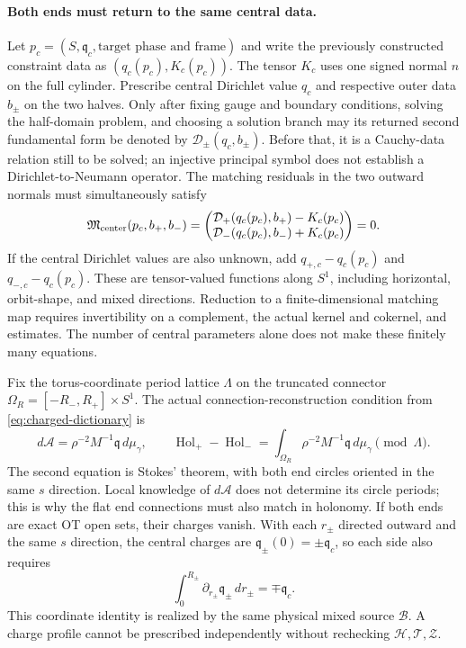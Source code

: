 \documentclass[a4paper,11pt]{article}
\numberwithin{equation}{section}
\theoremstyle{definition}
\begin{document}
\paragraph{Both ends must return to the same central data.}
Let $p_c=(S,\mathfrak q_c,\text{target phase and frame})$ and write the previously constructed constraint data as $(q_c(p_c),K_c(p_c))$.
The tensor $K_c$ uses one signed normal $n$ on the full cylinder.
Prescribe central Dirichlet value $q_c$ and respective outer data $b_\pm$ on the two halves.
Only after fixing gauge and boundary conditions, solving the half-domain problem, and choosing a solution branch may its returned second fundamental form be denoted by $\mathcal D_\pm(q_c,b_\pm)$.
Before that, it is a Cauchy-data relation still to be solved; an injective principal symbol does not establish a Dirichlet-to-Neumann operator.
The matching residuals in the two outward normals must simultaneously satisfy
\begin{equation}\label{eq:joint-center-return}
 \mathfrak M_{\rm center}(p_c,b_+,b_-)=
 \begin{pmatrix}
 \mathcal D_+(q_c(p_c),b_+)-K_c(p_c)\\
 \mathcal D_-(q_c(p_c),b_-)+K_c(p_c)
 \end{pmatrix}=0.
\end{equation}
If the central Dirichlet values are also unknown, add $q_{+,c}-q_c(p_c)$ and $q_{-,c}-q_c(p_c)$.
These are tensor-valued functions along $S^1$, including horizontal, orbit-shape, and mixed directions.
Reduction to a finite-dimensional matching map requires invertibility on a complement, the actual kernel and cokernel, and estimates.
The number of central parameters alone does not make these finitely many equations.

Fix the torus-coordinate period lattice $\Lambda$ on the truncated connector $\Omega_R=[-R_-,R_+]\times S^1$.
The actual connection-reconstruction condition from \eqref{eq:charged-dictionary} is
\begin{equation}\label{eq:holonomy-reconstruction}
 d\mathcal A=\rho^{-2}M^{-1}\mathfrak q\,d\mu_\gamma,\qquad
 \operatorname{Hol}_+-\operatorname{Hol}_-
 =\int_{\Omega_R}\rho^{-2}M^{-1}\mathfrak q\,d\mu_\gamma\pmod\Lambda.
\end{equation}
The second equation is Stokes' theorem, with both end circles oriented in the same $s$ direction.
Local knowledge of $d\mathcal A$ does not determine its circle periods; this is why the flat end connections must also match in holonomy.
If both ends are exact OT open sets, their charges vanish.
With each $r_\pm$ directed outward and the same $s$ direction, the central charges are $\mathfrak q_\pm(0)=\pm\mathfrak q_c$, so each side also requires
\[
 \int_0^{R_\pm}\partial_{r_\pm}\mathfrak q_\pm\,dr_\pm
 =\mp\mathfrak q_c.
\]
This coordinate identity is realized by the same physical mixed source $\mathscr B$.
A charge profile cannot be prescribed independently without rechecking $\mathscr H,\mathscr T,\mathscr Z$.
\end{document}
